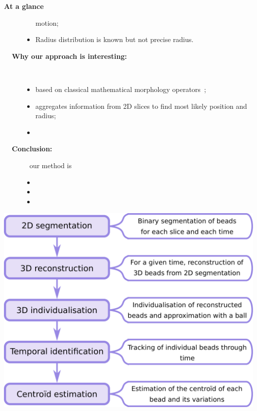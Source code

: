 \documentclass[final,svgnames,dvipsnames,table]{beamer}
\begin{document}
\begin{frame}[fragile]
\begin{exampleblock}{\bf At a glance}
\begin{multicols}{2}
\begin{description}
\begin{itemize}
        motion;
      \item Radius distribution is known but not precise radius.
      \end{itemize} \bigskip %
    \item[{\bf ~~Why our approach is interesting:}] ~ %
      \begin{itemize}
      \item based on classical mathematical morphology operators~{\color{cyan}\cite{morpho}};
      \item aggregates information from 2D slices to find most likely
        position and radius;
      \item 
      \end{itemize} \bigskip %
    \item[{\bf ~~Conclusion:} ] ~\newline %
      our method is
      \begin{itemize}
      \item 
      \item 
      \item 
      \end{itemize}
    \end{description}
    \includegraphics[width = 0.6\linewidth]{images/flowchart.pdf}
    \end{multicols}
   \end{exampleblock}
   
   
  \begin{columns}[t,totalwidth=\textwidth]

   \begin{column}{0.32\textwidth}
    

\end{column}
\end{columns}
\end{frame}
\end{document}
